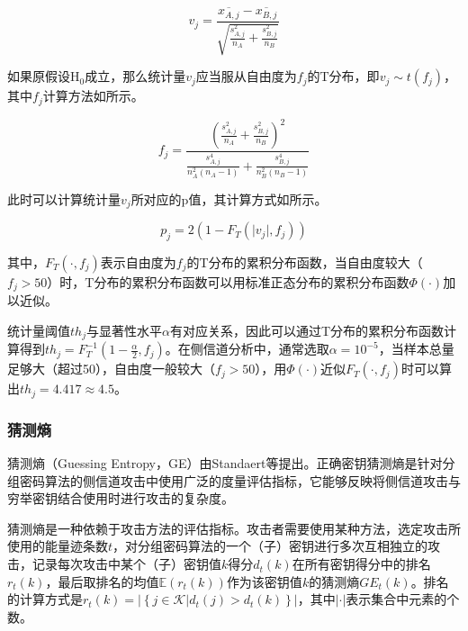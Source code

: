 {	\begin{equation}\label{eq:calct}
		v_j=\frac{\overline {x_{A,j}}-\overline{x_{B,j}}}{\sqrt{\frac{s_{A,j}^2}{n_A}+\frac{s_{B,j}^2}{n_B}}}
	\end{equation}
	
	如果原假设$\mathrm H_0$成立，那么统计量$v_j$应当服从自由度为$f_j$的T分布，即$v_j\sim t(f_j)$，其中$f_j$计算方法如所示。
	
	\begin{equation}\label{eq:calcdegoff}
		f_j=\frac{\left(\frac{s_{A,j}^2}{n_A} +\frac{s_{B,j}^2}{n_B}\right)^2 }{\frac{s_{A,j}^4}{n_A^2(n_A-1)}+\frac{s_{B,j}^4}{n_B^2(n_B-1)}}
	\end{equation}
	
	此时可以计算统计量$v_j$所对应的p值，其计算方式如所示。
	
	\begin{equation}\label{eq:calcp}
		p_j=2\left( 1-F_T(\vert v_j\vert ,f_j)\right) 
	\end{equation}
	
	\noindent 其中，$F_T(\cdot,f_j)$表示自由度为$f_j$的T分布的累积分布函数，当自由度较大（$f_j>50$）时，T分布的累积分布函数可以用标准正态分布的累积分布函数$\Phi(\cdot)$加以近似。
	
	统计量阈值$th_j$与显著性水平$\alpha$有对应关系，因此可以通过T分布的累积分布函数计算得到$th_j=F_T^{-1}\left( 1-\frac\alpha2,f_j\right) $。在侧信道分析中，通常选取$\alpha=10^{-5}$，当样本总量足够大（超过50），自由度一般较大（$f_j>50$），用$\Phi(\cdot)$近似$F_T(\cdot,f_j)$时可以算出$th_j=4.417\approx4.5$。
	
	\subsubsection{猜测熵}
	猜测熵（Guessing Entropy，GE）由Standaert等\citep{Standaert09}提出。正确密钥猜测熵是针对分组密码算法的侧信道攻击中使用广泛的度量评估指标，它能够反映将侧信道攻击与穷举密钥结合使用时进行攻击的复杂度。
	
	猜测熵是一种依赖于攻击方法的评估指标。攻击者需要使用某种方法，选定攻击所使用的能量迹条数$t$，对分组密码算法的一个（子）密钥进行多次互相独立的攻击，记录每次攻击中某个（子）密钥值$k$得分$d_t(k)$在所有密钥得分中的排名$r_t(k)$，最后取排名的均值$\mathbb E\left(r_t(k) \right) $作为该密钥值$k$的猜测熵$GE_{t}(k)$。排名的计算方式是$r_t(k)=\left\vert\left\lbrace j\in\mathcal K|d_t(j)>d_t(k)\right\rbrace  \right\vert $，其中$\vert\cdot\vert$表示集合中元素的个数。
	
}
